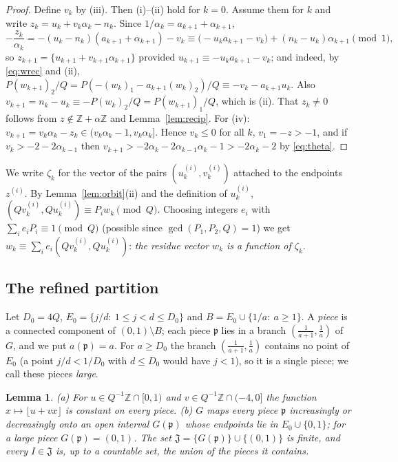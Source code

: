 \documentclass[11pt]{amsart}
\newtheorem{lemma}[theorem]{Lemma}
\theoremstyle{definition}
\numberwithin{equation}{section}
\newcommand{\Z}{\mathbb{Z}}
\newcommand{\fp}{\mathfrak{p}}
\newcommand{\fr}[1]{\{#1\}}
\begin{document}
\begin{proof}
Define $v_k$ by (iii). Then (i)--(ii) hold for $k=0$. Assume them for $k$ and write $z_k=u_k+v_k\alpha_k-n_k$. Since $1/\alpha_k=a_{k+1}+\alpha_{k+1}$,
\[
-\frac{z_k}{\alpha_k}=-(u_k-n_k)(a_{k+1}+\alpha_{k+1})-v_k\equiv\big(-u_ka_{k+1}-v_k\big)+(n_k-u_k)\alpha_{k+1}\pmod1 ,
\]
so $z_{k+1}=\fr{u_{k+1}+v_{k+1}\alpha_{k+1}}$ provided $u_{k+1}\equiv-u_ka_{k+1}-v_k$; and indeed, by \eqref{eq:wrec} and (ii),
$P(w_{k+1})_2/Q=P(-(w_k)_1-a_{k+1}(w_k)_2)/Q\equiv-v_k-a_{k+1}u_k$. Also $v_{k+1}=n_k-u_k\equiv-P(w_k)_2/Q=P(w_{k+1})_1/Q$, which is (ii).
That $z_k\ne0$ follows from $z\notin\Z+\alpha\Z$ and Lemma~\ref{lem:recip}.
For (iv): $v_{k+1}=v_k\alpha_k-z_k\in(v_k\alpha_k-1,v_k\alpha_k]$. Hence $v_k\le0$ for all $k$, $v_1=-z>-1$, and if $v_k>-2-2\alpha_{k-1}$ then
$v_{k+1}>-2\alpha_k-2\alpha_{k-1}\alpha_k-1>-2\alpha_k-2$ by \eqref{eq:theta}.
\end{proof}

We write $\zeta_k$ for the vector of the pairs $(u^{(i)}_k,v^{(i)}_k)$ attached to the endpoints $z^{(i)}$. By Lemma~\ref{lem:orbit}(ii) and the
definition of $u^{(i)}_k$, $(Qv^{(i)}_k,Qu^{(i)}_k)\equiv P_iw_k\pmod Q$. Choosing integers $e_i$ with $\sum_ie_iP_i\equiv1\pmod Q$ (possible since
$\gcd(P_1,P_2,Q)=1$) we get $w_k\equiv\sum_ie_i(Qv^{(i)}_k,Qu^{(i)}_k)$: \emph{the residue vector $w_k$ is a function of $\zeta_k$}.

\subsection{The refined partition}
Let $D_0=4Q$, $E_0=\{j/d:\ 1\le j<d\le D_0\}$ and $B=E_0\cup\{1/a:\ a\ge1\}$. A \emph{piece} is a connected component of $(0,1)\setminus B$; each piece $\fp$
lies in a branch $(\frac1{a+1},\frac1a)$ of $G$, and we put $a(\fp)=a$. For $a\ge D_0$ the branch $(\frac1{a+1},\frac1a)$ contains no point of $E_0$
(a point $j/d<1/D_0$ with $d\le D_0$ would have $j<1$), so it is a single piece; we call these pieces \emph{large}.

\begin{lemma}\label{lem:pieces}
\textup{(a)} For $u\in Q^{-1}\Z\cap[0,1)$ and $v\in Q^{-1}\Z\cap(-4,0]$ the function $x\mapsto\lfloor u+vx\rfloor$ is constant on every piece.
\textup{(b)} $G$ maps every piece $\fp$ increasingly or decreasingly onto an open interval $G(\fp)$ whose endpoints lie in $E_0\cup\{0,1\}$; for a large
piece $G(\fp)=(0,1)$. The set $\mathfrak J=\{G(\fp)\}\cup\{(0,1)\}$ is finite, and every $I\in\mathfrak J$ is, up to a countable set, the union of the
pieces it contains.
\end{lemma}
\end{document}
